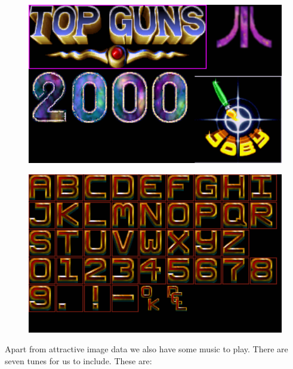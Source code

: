 \begin{minipage}[b]{0.48\linewidth}
\begin{figure}[H]
    \centering
    \begin{adjustbox}{width=6cm,center}
      \includegraphics[width=12cm]{cry/beasty7.png}%
    \end{adjustbox}
  \caption*{}
\end{figure}
\end{minipage}
\begin{minipage}[b]{0.48\linewidth}
\begin{figure}[H]
    \centering
    \begin{adjustbox}{width=6cm,center}
      \includegraphics[width=12cm]{cry/beasty8.png}%
    \end{adjustbox}
  \caption*{}
\end{figure}
\end{minipage}

Apart from attractive image data we also have some music to play. There are seven tunes for us to
include. These are:

